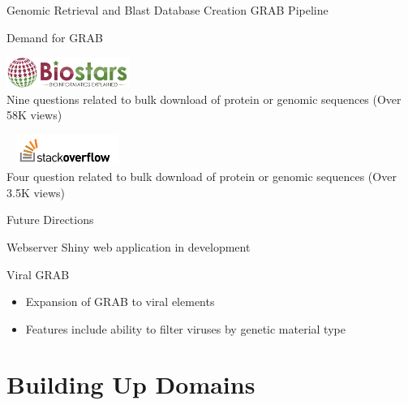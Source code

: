 \documentclass[11pt]{beamer}
\begin{document}
	\begin{frame}{Genomic Retrieval and Blast Database Creation}
	\center
	GRAB Pipeline
	
	
	\end{frame}
	

	\begin{frame}{Demand for GRAB}

	\includegraphics[height=1cm, width=4cm]{biostars.png} \\
	Nine questions related to bulk download of protein or genomic sequences (Over 58K views) 
	
	\includegraphics[height=1cm, width=4cm]{stack.png} \\
	Four question related to bulk download of protein or genomic sequences (Over 3.5K views)
	
	
	\end{frame}
	
	\begin{frame}{Future Directions}
	\begin{block}{Webserver}
	Shiny web application in development
	\end{block}
	
	\begin{block}{Viral GRAB}
	\begin{itemize}
	\item Expansion of GRAB to viral elements
	\item Features include ability to filter viruses by genetic material type
	\end{itemize}
	\end{block}
	\end{frame}
	
	

\section{Building Up Domains}
\subsection{}
	
\end{document}
